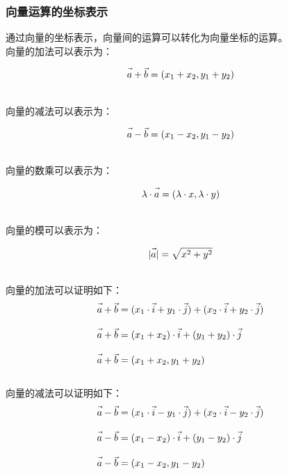 \documentclass[UTF8]{ctexart}
\let\nvec\vec
\def\vec#1{\nvec{\vphantom b\smash{#1}}}
\begin{document}
\newpage

\subsubsection{向量运算的坐标表示}
    \setcounter{equation}{0}
    通过向量的坐标表示，向量间的运算可以转化为向量坐标的运算。\\[3mm]
    向量的加法可以表示为：
    \begin{large}
        \begin{equation*}
            \vec{a}+\vec{b}=(x_1+x_2,y_1+y_2)
        \end{equation*}
    \end{large}\\
    向量的减法可以表示为：
    \begin{large}
        \begin{equation*}
            \vec{a}-\vec{b}=(x_1-x_2,y_1-y_2)
        \end{equation*}
    \end{large}\\
    向量的数乘可以表示为：
    \begin{large}
        \begin{equation*}
            \lambda\cdot\vec{a}=(\lambda\cdot x,\lambda\cdot y)
        \end{equation*}
    \end{large}\\
    向量的模可以表示为：
    \begin{large}
        \begin{equation*}
            |\vec{a}|=\sqrt{x^2+y^2}
        \end{equation*}
    \end{large}\\
    向量的加法可以证明如下：
    \begin{align}
        &\vec{a}+\vec{b}=(x_1\cdot\vec{i}+y_1\cdot\vec{j})+(x_2\cdot\vec{i}+y_2\cdot\vec{j})\\[3mm]
        &\vec{a}+\vec{b}=(x_1+x_2)\cdot\vec{i}+(y_1+y_2)\cdot\vec{j}\\[3mm]
        &\vec{a}+\vec{b}=(x_1+x_2,y_1+y_2)
    \end{align}\\
    向量的减法可以证明如下：
    \begin{align}
        &\vec{a}-\vec{b}=(x_1\cdot\vec{i}-y_1\cdot\vec{j})+(x_2\cdot\vec{i}-y_2\cdot\vec{j})\\[3mm]
        &\vec{a}-\vec{b}=(x_1-x_2)\cdot\vec{i}+(y_1-y_2)\cdot\vec{j}\\[3mm]
        &\vec{a}-\vec{b}=(x_1-x_2,y_1-y_2)
    \end{align}\\
\end{document}
